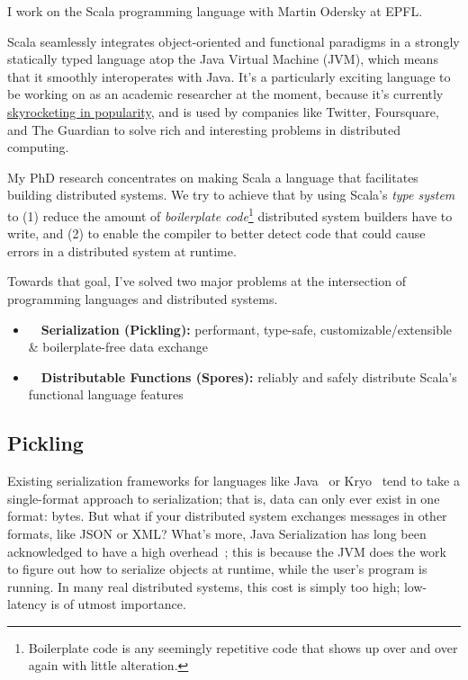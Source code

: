 \documentclass[acmtocl]{acmtrans2m}
\begin{document}
I work on the Scala programming language with Martin Odersky at EPFL.


Scala seamlessly integrates object-oriented and functional paradigms in a
strongly statically typed language atop the Java Virtual Machine (JVM), which
means that it smoothly interoperates with Java. It's a particularly exciting
language to be working on as an academic researcher at the moment, because it's currently
\href{http://www.indeed.com/jobtrends/scala,+groovy+and+java,+erlang,+haskell.html}{skyrocketing in popularity},
and is used by companies like Twitter, Foursquare, and The Guardian to solve
rich and interesting problems in distributed computing.

My PhD research concentrates on making Scala a language that facilitates
building distributed systems. We try to achieve that by using Scala's
\textit{type system} to (1) reduce the amount of \textit{boilerplate code}\footnote{Boilerplate code is any seemingly repetitive code that shows up over and over again with little alteration.} distributed system builders have to write, and
(2) to enable the compiler to better detect code that could cause errors
in a distributed system at runtime.

Towards that goal, I've solved two major problems at the intersection of
programming languages and distributed systems.

\vspace{-0.15in}
\begin{itemize}
\item ~~\textbf{\textsf{Serialization (Pickling):}} performant, type-safe, customizable/extensible \& boilerplate-free data exchange
\item ~~\textbf{\textsf{Distributable Functions (Spores):}} reliably and safely distribute Scala's functional language features
\end{itemize}

\vspace{-0.2in}
\subsection*{\textbf{Pickling}}
\vspace{-0.1in}

Existing serialization frameworks for languages like
Java~\cite{JavaSerialization} or Kryo~\cite{Kryo} tend to take a single-format
approach to serialization; that is, data can only ever exist in one format:
bytes. But what if your distributed system exchanges messages in other
formats, like JSON or XML? What's more, Java Serialization has long been
acknowledged to have a high overhead~\cite{JavaSlow1, Javaslow2}; this is
because the JVM does the work to figure out how to serialize objects at
runtime, while the user's program is running. In many real distributed
systems, this cost is simply too high; low-latency is of utmost importance.
\end{document}

